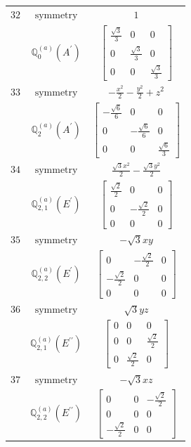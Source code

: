 \documentclass[fleqn,8pt,landscape]{jsarticle}
\begin{document}
\begin{longtable}{ccc}
$ 32 $ & $ \text{symmetry} $ & $ 1 $ \\
$  $ & $ \mathbb{Q}_{0}^{(a)}(A^{\prime}) $ & $ \begin{bmatrix} \frac{\sqrt{3}}{3} & 0 & 0 \\ 0 & \frac{\sqrt{3}}{3} & 0 \\ 0 & 0 & \frac{\sqrt{3}}{3} \end{bmatrix} $ \\ \hline
$ 33 $ & $ \text{symmetry} $ & $ - \frac{x^{2}}{2} - \frac{y^{2}}{2} + z^{2} $ \\
$  $ & $ \mathbb{Q}_{2}^{(a)}(A^{\prime}) $ & $ \begin{bmatrix} - \frac{\sqrt{6}}{6} & 0 & 0 \\ 0 & - \frac{\sqrt{6}}{6} & 0 \\ 0 & 0 & \frac{\sqrt{6}}{3} \end{bmatrix} $ \\ \hline
$ 34 $ & $ \text{symmetry} $ & $ \frac{\sqrt{3} x^{2}}{2} - \frac{\sqrt{3} y^{2}}{2} $ \\
$  $ & $ \mathbb{Q}_{2,1}^{(a)}(E^{\prime}) $ & $ \begin{bmatrix} \frac{\sqrt{2}}{2} & 0 & 0 \\ 0 & - \frac{\sqrt{2}}{2} & 0 \\ 0 & 0 & 0 \end{bmatrix} $ \\ \hline
$ 35 $ & $ \text{symmetry} $ & $ - \sqrt{3} x y $ \\
$  $ & $ \mathbb{Q}_{2,2}^{(a)}(E^{\prime}) $ & $ \begin{bmatrix} 0 & - \frac{\sqrt{2}}{2} & 0 \\ - \frac{\sqrt{2}}{2} & 0 & 0 \\ 0 & 0 & 0 \end{bmatrix} $ \\ \hline
$ 36 $ & $ \text{symmetry} $ & $ \sqrt{3} y z $ \\
$  $ & $ \mathbb{Q}_{2,1}^{(a)}(E^{\prime\prime}) $ & $ \begin{bmatrix} 0 & 0 & 0 \\ 0 & 0 & \frac{\sqrt{2}}{2} \\ 0 & \frac{\sqrt{2}}{2} & 0 \end{bmatrix} $ \\ \hline
$ 37 $ & $ \text{symmetry} $ & $ - \sqrt{3} x z $ \\
$  $ & $ \mathbb{Q}_{2,2}^{(a)}(E^{\prime\prime}) $ & $ \begin{bmatrix} 0 & 0 & - \frac{\sqrt{2}}{2} \\ 0 & 0 & 0 \\ - \frac{\sqrt{2}}{2} & 0 & 0 \end{bmatrix} $ \\ \hline

\end{longtable}
\end{document}
